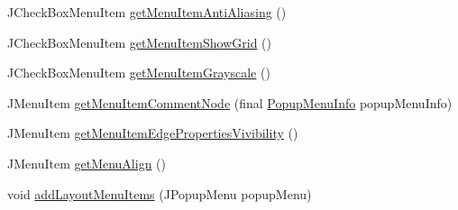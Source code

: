 \begin{DoxyCompactItemize}
\item 
J\-Check\-Box\-Menu\-Item \hyperlink{classorg_1_1tzi_1_1use_1_1gui_1_1views_1_1diagrams_1_1_diagram_view_a6d2cd2e83198e9e6c10a51a5a028a3c6}{get\-Menu\-Item\-Anti\-Aliasing} ()
\item 
J\-Check\-Box\-Menu\-Item \hyperlink{classorg_1_1tzi_1_1use_1_1gui_1_1views_1_1diagrams_1_1_diagram_view_af747262bc3aee9a3aad5e0d98253437a}{get\-Menu\-Item\-Show\-Grid} ()
\item 
J\-Check\-Box\-Menu\-Item \hyperlink{classorg_1_1tzi_1_1use_1_1gui_1_1views_1_1diagrams_1_1_diagram_view_a8d17aede40e7120f1ccb24d2bd1dd807}{get\-Menu\-Item\-Grayscale} ()
\item 
J\-Menu\-Item \hyperlink{classorg_1_1tzi_1_1use_1_1gui_1_1views_1_1diagrams_1_1_diagram_view_a166520a5049249d493b83e3088623cf8}{get\-Menu\-Item\-Comment\-Node} (final \hyperlink{classorg_1_1tzi_1_1use_1_1gui_1_1views_1_1diagrams_1_1_diagram_view_1_1_popup_menu_info}{Popup\-Menu\-Info} popup\-Menu\-Info)
\item 
J\-Menu\-Item \hyperlink{classorg_1_1tzi_1_1use_1_1gui_1_1views_1_1diagrams_1_1_diagram_view_a5fd8ece341d9f6f8693a0f6fb304dff2}{get\-Menu\-Item\-Edge\-Properties\-Vivibility} ()
\item 
J\-Menu\-Item \hyperlink{classorg_1_1tzi_1_1use_1_1gui_1_1views_1_1diagrams_1_1_diagram_view_a596336183b0b16324a0d6c5d52a74097}{get\-Menu\-Align} ()
\item 
void \hyperlink{classorg_1_1tzi_1_1use_1_1gui_1_1views_1_1diagrams_1_1_diagram_view_ae2541fc90fb0e3db12f5d9bd95d33a69}{add\-Layout\-Menu\-Items} (J\-Popup\-Menu popup\-Menu)
\end{DoxyCompactItemize}
